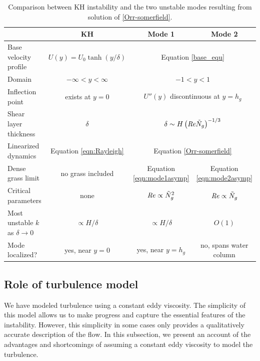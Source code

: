\documentclass{jfm}
\newcommand{\hg}{h_g}
\newcommand{\Ndg}{\tilde{N}_g}
\begin{document}
\begin{table}
{}  %
\renewcommand{\arraystretch}{1.2}
 \begin{tabular}{l|c|c|c}
			& KH 				& Mode 1 		& Mode 2 \\ \hline
 Base velocity profile 	& $U(y) = U_0 \tanh(y/\delta)$			& \multicolumn{2}{c}{Equation \eqref{base_equ}} \\
 Domain 		& $-\infty < y < \infty$			& \multicolumn{2}{c}{$-1<y<1$} \\
 Inflection point	& exists at $y=0$				& \multicolumn{2}{c}{$U''(y)$ discontinuous at $y=\hg$} \\
 Shear layer thickness	& $\delta$					& \multicolumn{2}{c}{$\delta \sim  H\left(\Rey \Ndg \right)^{-1/3}$} \\
 Linearized dynamics	& Equation \eqref{eqn:Rayleigh}		& \multicolumn{2}{c}{Equation \eqref{Orr-somerfield}} \\
 Dense grass limit &  no grass included & Equation \eqref{eqn:mode1asymp} & Equation \eqref{eqn:mode2asymp}  \\
 Critical parameters	& none						& $\Rey \propto \Ndg^{2}$ 	& $\Rey \propto \Ndg$ \\
 Most unstable $k$ as $\delta \to 0$	& $\propto H/\delta$		& $\propto H/\delta$	& $O(1)$ \\
 Mode localized?	& yes, near $y=0$				& yes, near $y=\hg$			& no, spans water column
 \end{tabular}
 \caption{Comparison between KH instability and the two unstable modes resulting from solution of \ref{Orr-somerfield}.}
 \label{tab:comparison}
\end{table}
\subsection{Role of turbulence model}\label{subsec:turbulencemodel}
We have modeled turbulence using a constant eddy viscosity. 
The simplicity of this model allows us to make progress and capture the essential features of the instability. 
However, this simplicity in some cases only provides a qualitatively accurate description of the flow. 
In this subsection, we present an account of the advantages and shortcomings of assuming a constant eddy viscosity to model the turbulence.
\end{document}
